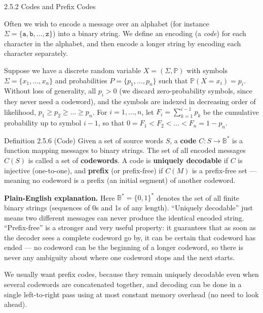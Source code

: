 \documentclass[aspectratio=169,10pt]{beamer}
\newcommand{\bbP}{\mathbb{P}}
\begin{document}
\begin{frame}[allowframebreaks]{2.5.2 Codes and Prefix Codes}

Often we wish to encode a message over an alphabet (for instance
$\Sigma = \{\texttt{a}, \texttt{b}, \ldots, \texttt{z}\}$) into a binary
string. We define an encoding (a \emph{code}) for each character in the
alphabet, and then encode a longer string by encoding each character
separately.

Suppose we have a discrete random variable $X = (\Sigma, \bbP)$ with symbols
$\Sigma = \{x_1, \ldots, x_n\}$ and probabilities $P = \{p_1, \ldots, p_n\}$
such that $\bbP(X{=}x_i) = p_i$. Without loss of generality, all $p_i > 0$
(we discard zero-probability symbols, since they never need a codeword), and
the symbols are indexed in decreasing order of likelihood,
$p_1 \geq p_2 \geq \ldots \geq p_n$. For $i = 1,\ldots,n$, let
$F_i = \sum_{k=1}^{i-1} p_k$ be the cumulative probability up to symbol
$i-1$, so that $0 = F_1 < F_2 < \ldots < F_n = 1 - p_n$.

\framebreak

\begin{block}{Definition 2.5.6 (Code)}
Given a set of source words $S$, a \textbf{code} $C : S \to \mathbb{B}^*$ is
a function mapping messages to binary strings. The set of all encoded
messages $C(S)$ is called a set of \textbf{codewords}. A code is
\textbf{uniquely decodable} if $C$ is injective (one-to-one), and
\textbf{prefix} (or prefix-free) if $C(M)$ is a prefix-free set --- meaning
no codeword is a prefix (an initial segment) of another codeword.
\end{block}

\textbf{Plain-English explanation.} Here $\mathbb{B}^* = \{0,1\}^*$ denotes
the set of all finite binary strings (sequences of 0s and 1s of any length).
``Uniquely decodable'' just means two different messages can never produce
the identical encoded string. ``Prefix-free'' is a stronger and very useful
property: it guarantees that as soon as the decoder sees a complete
codeword go by, it can be certain that codeword has ended --- no codeword
can be the beginning of a longer codeword, so there is never any ambiguity
about where one codeword stops and the next starts.

We usually want prefix codes, because they remain uniquely decodable even
when several codewords are concatenated together, and decoding can be done
in a single left-to-right pass using at most constant memory overhead (no
need to look ahead).


\end{frame}
\end{document}
